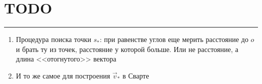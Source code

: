 \documentclass[a4paper,12pt]{article}
\renewcommand{\.}{\hspace{0.2ex}}
\begin{document}
\section{TODO}

  \hrule

  \bigskip

  \begin{enumerate}
    \item Процедура поиска точки $s_*$: при равенстве углов еще мерить расстояние до $o$ и брать ту из точек, расстояние у которой больше. Или не расстояние, а длина <<отогнутого>> вектора

    \item И то же самое для построения $\vec v_*$ в Сварте
  \end{enumerate}
\end{document}
